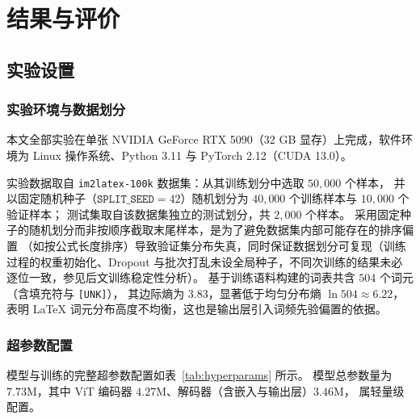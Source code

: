 \section{结果与评价}
\subsection{实验设置}
\subsubsection{实验环境与数据划分}
本文全部实验在单张 NVIDIA GeForce RTX 5090（32 GB 显存）上完成，软件环境为 Linux 操作系统、Python 3.11 与 PyTorch 2.12（CUDA 13.0）。

实验数据取自 \texttt{im2latex-100k} 数据集：从其训练划分中选取 $50{,}000$ 个样本，
并以固定随机种子（$\texttt{SPLIT\_SEED}=42$）随机划分为 $40{,}000$ 个训练样本与 $10{,}000$ 个验证样本；
测试集取自该数据集独立的测试划分，共 $2{,}000$ 个样本。
采用固定种子的随机划分而非按顺序截取末尾样本，是为了避免数据集内部可能存在的排序偏置
（如按公式长度排序）导致验证集分布失真，同时保证数据划分可复现（训练过程的权重初始化、Dropout 与批次打乱未设全局种子，不同次训练的结果未必逐位一致，参见后文训练稳定性分析）。
基于训练语料构建的词表共含 $504$ 个词元（含填充符与 \texttt{[UNK]}），
其边际熵为 $3.83$，显著低于均匀分布熵 $\ln 504 \approx 6.22$，
表明 LaTeX 词元分布高度不均衡，这也是输出层引入词频先验偏置的依据。

\subsubsection{超参数配置}
模型与训练的完整超参数配置如表~\ref{tab:hyperparams} 所示。
模型总参数量为 $7.73$M，其中 ViT 编码器 $4.27$M、解码器（含嵌入与输出层）$3.46$M，
属轻量级配置。

